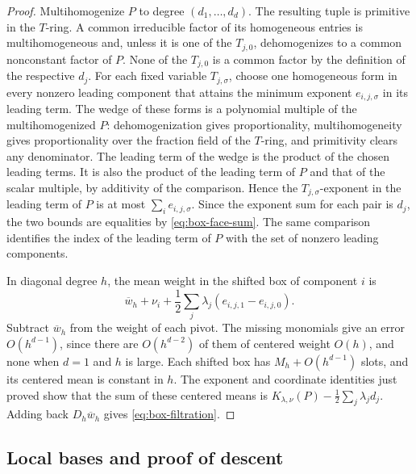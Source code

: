 \documentclass[11pt,a4paper,reqno]{amsart}
\theoremstyle{definition}
\theoremstyle{remark}
\numberwithin{equation}{section}
\begin{document}
\begin{proof}
Multihomogenize \(P\) to degree \((d_1,\ldots,d_d)\).
The resulting tuple is primitive in the \(T\)-ring. A common
irreducible factor of its homogeneous entries is multihomogeneous
and, unless it is one of the \(T_{j,0}\), dehomogenizes to a common
nonconstant factor of \(P\). None of the \(T_{j,0}\) is a common
factor by the definition of the respective \(d_j\).
For each fixed variable \(T_{j,\sigma}\), choose one homogeneous
form in every nonzero leading component that attains the minimum
exponent \(e_{i,j,\sigma}\) in its leading term. The wedge of these
forms is a polynomial multiple of the multihomogenized \(P\):
dehomogenization gives proportionality, multihomogeneity gives
proportionality over the fraction field of the \(T\)-ring, and
primitivity clears any denominator. The leading term of the wedge
is the product of the chosen leading terms. It is also the product
of the leading term of \(P\) and that of the scalar multiple, by
additivity of the comparison. Hence the \(T_{j,\sigma}\)-exponent
in the leading term of \(P\) is at most \(\sum_i e_{i,j,\sigma}\).
Since the exponent sum for each pair is \(d_j\), the two bounds are
equalities by \eqref{eq:box-face-sum}. The same comparison identifies
the index of the leading term of \(P\) with the set of nonzero leading
components.

In diagonal degree \(h\), the mean weight in the shifted box of
component \(i\) is
\[
 \overline w_h+\nu_i+
   \frac12\sum_j\lambda_j(e_{i,j,1}-e_{i,j,0}).
\]
Subtract \(\overline w_h\) from the weight of each pivot. The missing
monomials give an error \(O(h^{d-1})\), since there are
\(O(h^{d-2})\) of them of centered weight \(O(h)\), and none when
\(d=1\) and \(h\) is large. Each shifted box has
\(M_h+O(h^{d-1})\) slots, and its centered mean is constant in \(h\).
The exponent and coordinate identities just proved show that the
sum of these centered means is
\(K_{\lambda,\nu}(P)-\frac12\sum_j\lambda_jd_j\). Adding back
\(D_h\overline w_h\) gives \eqref{eq:box-filtration}.
\end{proof}


\subsection{Local bases and proof of descent}
\end{document}
